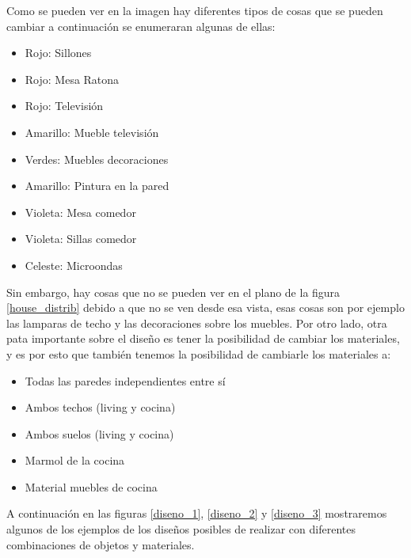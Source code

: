 Como se pueden ver en la imagen hay diferentes tipos de cosas que se pueden cambiar a continuación se enumeraran algunas de ellas:

\begin{itemize}
    \item Rojo: Sillones
    \item Rojo: Mesa Ratona
    \item Rojo: Televisión
    \item Amarillo: Mueble televisión
    \item Verdes: Muebles decoraciones
    \item Amarillo: Pintura en la pared
    \item Violeta: Mesa comedor
    \item Violeta: Sillas comedor
    \item Celeste: Microondas
\end{itemize}

Sin embargo, hay cosas que no se pueden ver en el plano de la figura \ref{house_distrib} debido a que no se ven desde esa vista, esas cosas son por ejemplo las lamparas de techo y las decoraciones sobre los muebles. Por otro lado, otra pata importante sobre el diseño es tener la posibilidad de cambiar los materiales, y es por esto que también tenemos la posibilidad de cambiarle los materiales a:

\begin{itemize}
    \item Todas las paredes independientes entre sí
    \item Ambos techos (living y cocina)
    \item Ambos suelos (living y cocina)
    \item Marmol de la cocina
    \item Material muebles de cocina
\end{itemize}

A continuación en las figuras \ref{diseno_1}, \ref{diseno_2} y \ref{diseno_3} mostraremos algunos de los ejemplos de los diseños posibles de realizar con diferentes combinaciones de objetos y materiales.

